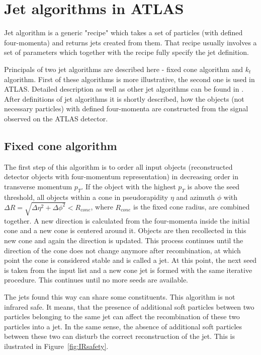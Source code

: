 \documentclass[a4paper,11pt]{report}
\newcommand{\pt}{p_T}
\begin{document}
\section{Jet algorithms in ATLAS}
\label{sec:JetAlgorithmATLAS}

Jet algorithm is a generic "recipe" which takes a set of particles (with defined
four-momenta) and returns jets created from them. That recipe usually involves a
set of parameters which together with the recipe fully specify the jet
definition. 

Principals of two jet algorithms are described here - fixed cone algorithm and
$k_t$ algorithm. First of these algorithms is more illustrative, the second one
is used in ATLAS. Detailed description as well as other jet algorithms can be
found in \cite{ATLASmain}. After definitions of jet algorithms it is shortly
described, how the objects (not necessary particles) with defined four-momenta
are constructed from the signal observed on the ATLAS detector. 

\subsection{Fixed cone algorithm}

The first step of this algorithm is to order all input objects (reconstructed
detector objects with four-momentum representation) in decreasing order in
transverse momentum $\pt$. If the object with the highest $\pt$ is above the
seed threshold, all objects within a cone in pseudorapidity $\eta$ and azimuth
$\phi$ with $\Delta R = \sqrt{\Delta \eta^2 + \Delta \phi^2} < R_{cone}$, where
$R_{cone}$ is the fixed cone radius, are combined together. A new direction is
calculated from the four-momenta inside the initial cone and a new cone is
centered around it. Objects are then recollected in this new cone and again the
direction is updated. This process continues until the direction of the cone
does not change anymore after recombination, at which point the cone is
considered stable and is called a jet. At this point, the next seed is taken
from the input list and a new cone jet is formed with the same iterative
procedure. This continues until no more seeds are available. 

The jets found this way can share some constituents. This algorithm is not
infrared safe. It means, that the presence of additional soft particles between
two particles belonging to the same jet can affect the recombination of these
two particles into a jet. In the same sense, the absence of additional soft
particles between these two can disturb the correct reconstruction of the jet.
This is ilustrated in Figure~\ref{fig:IRsafety}.
\end{document}
